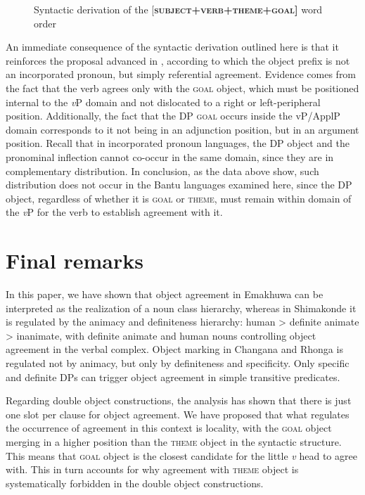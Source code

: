 \documentclass[output=paper]{langsci/langscibook}
\begin{document}
 
\begin{figure}

\caption{Syntactic derivation of the [{\textbf{\textsc{subject+verb+theme+goal]}}} word order}
\label{fig:4}
\end{figure}

An immediate consequence of the syntactic derivation outlined here is that it reinforces the proposal advanced in , according to which the object prefix is not an incorporated pronoun, but simply referential agreement. Evidence comes from the fact that the verb agrees only with the \textsc{goal} object, which must be positioned internal to the {\textit{v}}P domain and not dislocated to a right or left-peripheral position. Additionally, the fact that the DP \textsc{goal} occurs inside the vP/ApplP domain corresponds to it not being in an adjunction position, but in an argument position. Recall that in incorporated pronoun languages, the DP object and the pronominal inflection cannot co-occur in the same domain, since they are in complementary distribution. In conclusion, as the data above show, such distribution does not occur in the Bantu languages examined here, since the DP object, regardless of whether it is \textsc{goal} or \textsc{theme}, must remain within domain of the {\textit{v}}P for the verb to establish agreement with it.

\section{Final remarks}

In this paper, we have shown that object agreement in Emakhuwa can be interpreted as the realization of a noun class hierarchy, whereas in Shimakonde it is regulated by the animacy and definiteness hierarchy: human {\textgreater} definite animate {\textgreater} inanimate, with definite animate and human nouns controlling object agreement in the verbal complex. Object marking in Changana and Rhonga is regulated not by animacy, but only by definiteness and specificity. Only specific and definite DPs can trigger object agreement in simple transitive predicates.

Regarding double object constructions, the analysis has shown that there is just one slot per clause for object agreement. We have proposed that what regulates the occurrence of agreement in this context is locality, with the \textsc{goal} object merging in a higher position than the \textsc{theme} object in the syntactic structure. This means that \textsc{goal} object is the closest candidate for the little {\textit{v}} head to agree with. This in turn accounts for why agreement with \textsc{theme} object is systematically forbidden in the double object constructions. 
\end{document}
